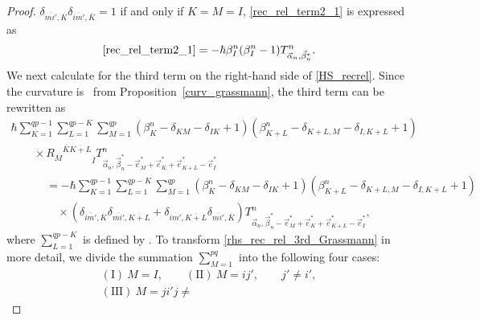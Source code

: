 \documentclass[pdftex]{sigma}
\numberwithin{equation}{section}
\begin{document}
\begin{proof}
$
 \delta_{
 \overline{mi'},
 \overline{K}
 }
 \delta_{
 \overline{im'},
 \overline{K}
 }
 =
 1
$
if and only if $K=M=I$, \eqref{rec_rel_term2_1} is expressed as
\begin{align}
 \eqref{rec_rel_term2_1}
 =
 -
 \hbar
 \beta_{I}^{n}
 (
 \beta_{I}^{n}
 -
 1
 )
 T^{n}_{\vec{\alpha}_{n},\vec{\beta}_{n}^{\ast}}.
 \label{recrel_gene_2nd}
\end{align}
We next calculate for the third term on the right-hand side of \eqref{HS_recrel}. Since the curvature is~
from Proposition~\ref{curv_grassmann}, the third term can be rewritten as
\begin{gather}
 \hbar
 \sum_{K=1}^{qp-1}
 \sum_{L=1}^{qp-K}
 \sum_{M=1}^{qp}
 (
 \beta_{K}^{n}
 -
 \delta_{KM}
 -
 \delta_{IK}
 +
 1
 )
 (
 \beta_{K+L}^{n}
 -
 \delta_{K+L,M}
 -
 \delta_{I,K+L}
 +
 1
 )
 \nonumber
 \\
 \qquad
 \times
 {{R_{\overline{M}}}^{\overline{K} \overline{K+L}}}_{\overline{I}}
 T^{n}_{\vec{\alpha}_{n},\vec{\beta}_{n}^{\ast}-\vec{e}_{M}^{\ast}+\vec{e}_{K}^{\ast}+\vec{e}_{K+L}^{\ast}-\vec{e}_{I}^{\ast}}
 \nonumber
 \\
 \phantom{\qquad
 \times}{}=
 -
 \hbar
 \sum_{K=1}^{qp-1}
 \sum_{L=1}^{qp-K}
 \sum_{M=1}^{qp}
 (
 \beta_{K}^{n}
 -
 \delta_{KM}
 -
 \delta_{IK}
 +
 1
 )
 (
 \beta_{K+L}^{n}
 -
 \delta_{K+L,M}
 -
 \delta_{I,K+L}
 +
 1
 )
 \nonumber
 \\
 \phantom{\qquad
 \times=}{}
 \times
 (
 \delta_{
 \overline{im'},
 \overline{K}
 }
 \delta_{
 \overline{mi'},
 \overline{K+L}
 }
 +
 \delta_{
 \overline{im'},
 \overline{K+L}
 }
 \delta_{
 \overline{mi'},
 \overline{K}
 }
 )
 T^{n}_{\vec{\alpha}_{n},\vec{\beta}_{n}^{\ast}-\vec{e}_{M}^{\ast}+\vec{e}_{K}^{\ast}+\vec{e}_{K+L}^{\ast}-\vec{e}_{I}^{\ast}},
 \label{rhs_rec_rel_3rd_Grassmann}
\end{gather}
where $\sum_{L=1}^{qp-K}$ is defined by
.
To transform \eqref{rhs_rec_rel_3rd_Grassmann} in more detail, we divide the summation $\sum_{M=1}^{pq}$ into the following four cases:
\begin{gather*}
 (\textrm{I}) \
 M=I,
 \qquad
 (\textrm{II}) \
 M=ij',
\qquad
 j'
 \neq
 i',
 \\
 (\textrm{III}) \
 M=ji'
 j
 \neq

\end{gather*}
\end{proof}
\end{document}

